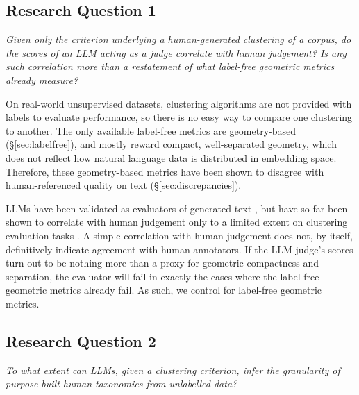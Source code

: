 \documentclass[11pt,a4paper,oneside]{report}
\begin{document}
\subsection{Research Question 1}

\emph{Given only the criterion underlying a human-generated clustering of a corpus, do the scores of an LLM acting as a judge correlate with human judgement? Is any such correlation more than a restatement of what label-free geometric metrics already measure?}                                                                                                                                                                                         

\vspace{\baselineskip}

On real-world unsupervised datasets, clustering algorithms are not provided with labels to evaluate performance, so there is no easy way to compare one clustering to another. The only available label-free metrics are geometry-based (\S\ref{sec:labelfree}), and mostly reward compact, well-separated geometry, which does not reflect how natural language data is distributed in embedding space. Therefore, these geometry-based metrics have been shown to disagree with human-referenced quality on text (\S\ref{sec:discrepancies}).

LLMs have been validated as evaluators of generated text \citep{zheng2023judging}, but have so far been shown to correlate with human judgement only to a limited extent on clustering evaluation tasks \citep{hoyle2025proxann}. A simple correlation with human judgement does not, by itself, definitively indicate agreement with human annotators. If the LLM judge's scores turn out to be nothing more than a proxy for geometric compactness and separation, the evaluator will fail in exactly the cases where the label-free geometric metrics already fail. As such, we control for label-free geometric metrics.

\subsection{Research Question 2}

\emph{To what extent can LLMs, given a clustering criterion, infer the granularity of purpose-built human taxonomies from unlabelled data?}

\vspace{\baselineskip}
\end{document}
